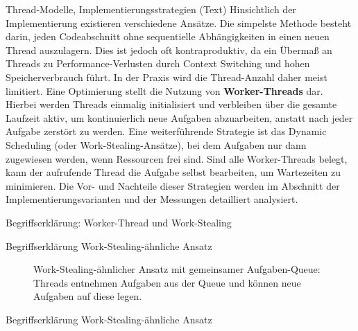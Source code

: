 \documentclass[10pt, ngerman]{beamer}
\begin{document}
\begin{frame}{Thread-Modelle, Implementierungsstrategien (Text)}
    Hinsichtlich der Implementierung existieren verschiedene Ansätze. Die simpelste Methode besteht darin, jeden Codeabschnitt ohne sequentielle Abhängigkeiten in einen neuen Thread auszulagern. Dies ist jedoch oft kontraproduktiv, da ein Übermaß an Threads zu Performance-Verlusten durch Context Switching und hohen Speicherverbrauch führt. In der Praxis wird die Thread-Anzahl daher meist limitiert.
    \newline
    Eine Optimierung stellt die Nutzung von \textbf{Worker-Threads} dar. Hierbei werden Threads einmalig initialisiert und verbleiben über die gesamte Laufzeit aktiv, um kontinuierlich neue Aufgaben abzuarbeiten, anstatt nach jeder Aufgabe zerstört zu werden. Eine weiterführende Strategie ist das Dynamic Scheduling (oder Work-Stealing-Ansätze), bei dem Aufgaben nur dann zugewiesen werden, wenn Ressourcen frei sind. Sind alle Worker-Threads belegt, kann der aufrufende Thread die Aufgabe selbst bearbeiten, um Wartezeiten zu minimieren. Die Vor- und Nachteile dieser Strategien werden im Abschnitt der Implementierungsvarianten und der Messungen detailliert analysiert.
\end{frame}

\begin{frame}{Begriffserklärung: Worker-Thread und Work-Stealing}
    \WorkerThreadErklaerung
    \\[1cm]
    \WorkStealingErklaerung
\end{frame}

\begin{frame}{Begriffserklärung Work-Stealing-ähnliche Ansatz}
    \begin{figure}[h]
        \centering
        \scalebox{0.9}{
            \WorkerthreadsAbildung
        }
        \caption[Work-Stealing-ähnlicher Ansatz mit gemeinsamer Aufgaben-Queue]{Work-Stealing-ähnlicher Ansatz mit gemeinsamer Aufgaben-Queue: Threads entnehmen Aufgaben aus der Queue und können neue Aufgaben auf diese legen.}
        \label{fig:workstealing_dynamisch}
    \end{figure}
\end{frame}

\begin{frame}{Begriffserklärung Work-Stealing-ähnliche Ansatz}
    \WorkStealingAehnlichErklaerung
\end{frame}
\end{document}
